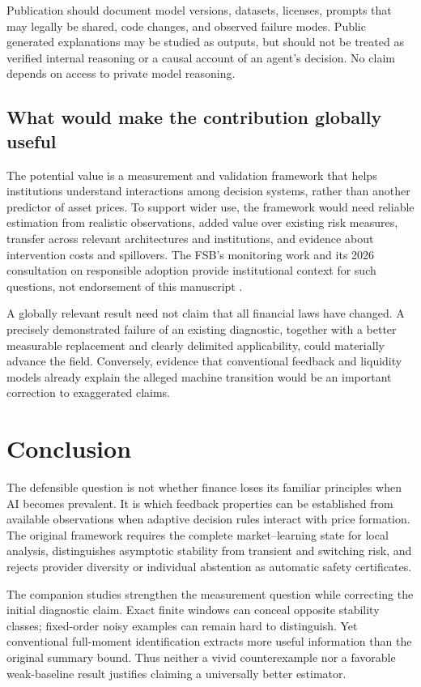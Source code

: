 \documentclass[11pt,a4paper]{article}
\theoremstyle{definition}
\theoremstyle{remark}
\begin{document}
Publication should document model versions, datasets, licenses, prompts that may legally be shared, code changes, and observed failure modes. Public generated explanations may be studied as outputs, but should not be treated as verified internal reasoning or a causal account of an agent's decision. No claim depends on access to private model reasoning.

\subsection{What would make the contribution globally useful}
The potential value is a measurement and validation framework that helps institutions understand interactions among decision systems, rather than another predictor of asset prices. To support wider use, the framework would need reliable estimation from realistic observations, added value over existing risk measures, transfer across relevant architectures and institutions, and evidence about intervention costs and spillovers. The FSB's monitoring work and its 2026 consultation on responsible adoption provide institutional context for such questions, not endorsement of this manuscript \citep{fsb2025,fsb2026}.

A globally relevant result need not claim that all financial laws have changed. A precisely demonstrated failure of an existing diagnostic, together with a better measurable replacement and clearly delimited applicability, could materially advance the field. Conversely, evidence that conventional feedback and liquidity models already explain the alleged machine transition would be an important correction to exaggerated claims.

\section{Conclusion}
The defensible question is not whether finance loses its familiar principles when AI becomes prevalent. It is which feedback properties can be established from available observations when adaptive decision rules interact with price formation. The original framework requires the complete market--learning state for local analysis, distinguishes asymptotic stability from transient and switching risk, and rejects provider diversity or individual abstention as automatic safety certificates.

The companion studies strengthen the measurement question while correcting the initial diagnostic claim. Exact finite windows can conceal opposite stability classes; fixed-order noisy examples can remain hard to distinguish. Yet conventional full-moment identification extracts more useful information than the original summary bound. Thus neither a vivid counterexample nor a favorable weak-baseline result justifies claiming a universally better estimator.
\end{document}
